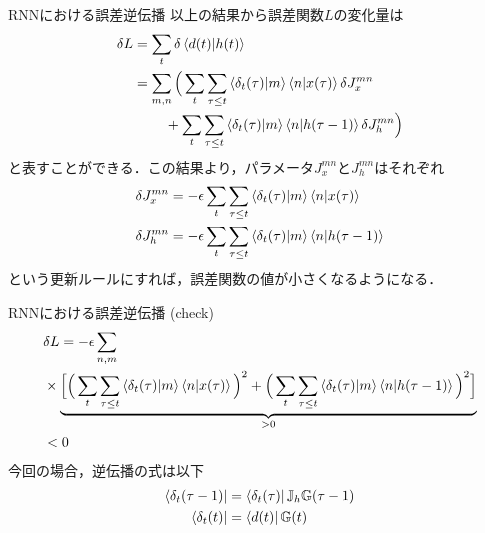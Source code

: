 \documentclass[dvipdfmx,10pt]{beamer}
\begin{document}
  \begin{frame}{RNNにおける誤差逆伝播}
    以上の結果から誤差関数$L$の変化量は
    \begin{align*}
      \delta L 
      &= \sum_{t}\delta\braket{d(t)|h(t)}\\
      &= \sum_{m,n} \Big( \sum_{t}\sum_{\tau \leq t} \braket{\delta_t (\tau)|m} \braket{n|x(\tau)}\delta J_x^{mn}\\
      &\hspace{0.8cm}+ \sum_{t}\sum_{\tau \leq t} \braket{\delta_t (\tau)|m} \braket{n|h(\tau-1)}\delta J_h^{mn} \Big)
    \end{align*}
    と表すことができる．この結果より，パラメータ$J_x^{mn}$と$J_h^{mn}$はそれぞれ
    \begin{align*}
      \delta J_x^{mn} &= -\epsilon \sum_{t}\sum_{\tau \leq t} \braket{\delta_t (\tau)|m} \braket{n|x(\tau)}\\
      \delta J_h^{mn} &= -\epsilon \sum_{t}\sum_{\tau \leq t} \braket{\delta_t (\tau)|m} \braket{n|h(\tau-1)}
    \end{align*}
    という更新ルールにすれば，誤差関数の値が小さくなるようになる．
  \end{frame}

  \begin{frame}{RNNにおける誤差逆伝播}
    (check)
    \begin{align*}
      &\delta L = -\epsilon \sum_{n,m} \\
      &\times \underbrace{\Big[ \Big( \sum_t \sum_{\tau \leq t} \braket{\delta_t(\tau)|m}\braket{n|x(\tau)} \Big)^2 + \Big( \sum_t \sum_{\tau \leq t} \braket{\delta_t(\tau)|m}\braket{n|h(\tau-1)} \Big)^2 \Big]}_{>0}\\
      &<0
    \end{align*}
    今回の場合，逆伝播の式は以下
    \begin{align*}
      \bra{\delta_t (\tau-1)} &= \bra{\delta_t (\tau)}\mathbb{J}_h \mathbb{G}(\tau-1)\\
      \bra{\delta_t (t)} &= \bra{d(t)}\mathbb{G}(t)
    \end{align*}
  \end{frame}
\end{document}

